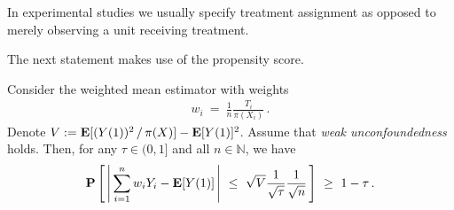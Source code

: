 In experimental studies we usually specify treatment assignment as opposed to merely observing a unit receiving treatment. 

The next statement makes use of the propensity score.

\begin{theorem*}
  Consider the weighted mean estimator with weights
  \begin{gather}
    w_i
    \ 
    =
    \ 
    \frac{1}{n}
    \frac{T_i}{\pi(X_i)}
    \,.
  \end{gather}
  Denote
  $
    V:=
    \mathbf{E}[
    (
      Y(1)
    )^2
    \,/\,
    \pi(X)
    ]
    -
    \mathbf{E}[Y(1)]^2
  $.  
  Assume that \textit{weak unconfoundedness} holds.
  Then, for any $\tau \in (0,1]$ and all $n\in\mathbb{N}$, we have
  \begin{gather}
   \P
   \left[
     \,
     \left| 
     \,
   \sum_{i=1}^{n}
   w_iY_i - \E[Y(1)]
   \,
     \right|
     \ 
     \le
     \ 
     \sqrt{V}
     \frac{1}{\sqrt{\tau}}
     \frac{1}{\sqrt{n}}
     \,
   \right]
   \ 
   \ge
   \ 
   1-\tau\,.
  \end{gather}

\end{theorem*}
